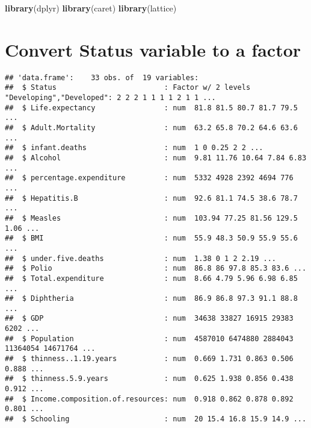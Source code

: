 \documentclass[
]{article}
\newenvironment{Shaded}{\begin{snugshade}}{\end{snugshade}}
\newcommand{\AttributeTok}[1]{\textcolor[rgb]{0.13,0.29,0.53}{#1}}
\newcommand{\FunctionTok}[1]{\textcolor[rgb]{0.13,0.29,0.53}{\textbf{#1}}}
\newcommand{\NormalTok}[1]{#1}
\newcommand{\OtherTok}[1]{\textcolor[rgb]{0.56,0.35,0.01}{#1}}
\newcommand{\SpecialCharTok}[1]{\textcolor[rgb]{0.81,0.36,0.00}{\textbf{#1}}}
\newcommand{\StringTok}[1]{\textcolor[rgb]{0.31,0.60,0.02}{#1}}
\begin{document}
\begin{Shaded}
\begin{Highlighting}[]
\FunctionTok{library}\NormalTok{(dplyr)}
\FunctionTok{library}\NormalTok{(caret)}
\FunctionTok{library}\NormalTok{(lattice)}
\end{Highlighting}
\end{Shaded}

\section{Convert Status variable to a
factor}\label{convert-status-variable-to-a-factor}

\begin{Shaded}
\end{Shaded}

\begin{verbatim}
## 'data.frame':    33 obs. of  19 variables:
##  $ Status                         : Factor w/ 2 levels "Developing","Developed": 2 2 2 1 1 1 1 2 1 1 ...
##  $ Life.expectancy                : num  81.8 81.5 80.7 81.7 79.5 ...
##  $ Adult.Mortality                : num  63.2 65.8 70.2 64.6 63.6 ...
##  $ infant.deaths                  : num  1 0 0.25 2 2 ...
##  $ Alcohol                        : num  9.81 11.76 10.64 7.84 6.83 ...
##  $ percentage.expenditure         : num  5332 4928 2392 4694 776 ...
##  $ Hepatitis.B                    : num  92.6 81.1 74.5 38.6 78.7 ...
##  $ Measles                        : num  103.94 77.25 81.56 129.5 1.06 ...
##  $ BMI                            : num  55.9 48.3 50.9 55.9 55.6 ...
##  $ under.five.deaths              : num  1.38 0 1 2 2.19 ...
##  $ Polio                          : num  86.8 86 97.8 85.3 83.6 ...
##  $ Total.expenditure              : num  8.66 4.79 5.96 6.98 6.85 ...
##  $ Diphtheria                     : num  86.9 86.8 97.3 91.1 88.8 ...
##  $ GDP                            : num  34638 33827 16915 29383 6202 ...
##  $ Population                     : num  4587010 6474880 2884043 11364054 14671764 ...
##  $ thinness..1.19.years           : num  0.669 1.731 0.863 0.506 0.888 ...
##  $ thinness.5.9.years             : num  0.625 1.938 0.856 0.438 0.912 ...
##  $ Income.composition.of.resources: num  0.918 0.862 0.878 0.892 0.801 ...
##  $ Schooling                      : num  20 15.4 16.8 15.9 14.9 ...
\end{verbatim}
\end{document}
